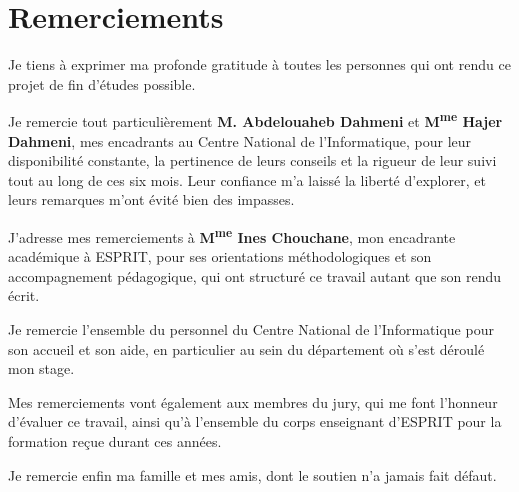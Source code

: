 \chapter*{Remerciements}

Je tiens à exprimer ma profonde gratitude à toutes les personnes qui ont rendu ce
projet de fin d'études possible.

Je remercie tout particulièrement \textbf{M. Abdelouaheb Dahmeni} et
\textbf{M\textsuperscript{me} Hajer Dahmeni}, mes encadrants au Centre National de
l'Informatique, pour leur disponibilité constante, la pertinence de leurs conseils et
la rigueur de leur suivi tout au long de ces six mois. Leur confiance m'a laissé la
liberté d'explorer, et leurs remarques m'ont évité bien des impasses.

J'adresse mes remerciements à \textbf{M\textsuperscript{me} Ines Chouchane}, mon
encadrante académique à ESPRIT, pour ses orientations méthodologiques et son
accompagnement pédagogique, qui ont structuré ce travail autant que son rendu écrit.

Je remercie l'ensemble du personnel du Centre National de l'Informatique pour son
accueil et son aide, en particulier au sein du département où s'est déroulé mon stage.

Mes remerciements vont également aux membres du jury, qui me font l'honneur d'évaluer
ce travail, ainsi qu'à l'ensemble du corps enseignant d'ESPRIT pour la formation reçue
durant ces années.

Je remercie enfin ma famille et mes amis, dont le soutien n'a jamais fait défaut.

\vspace{1cm}
